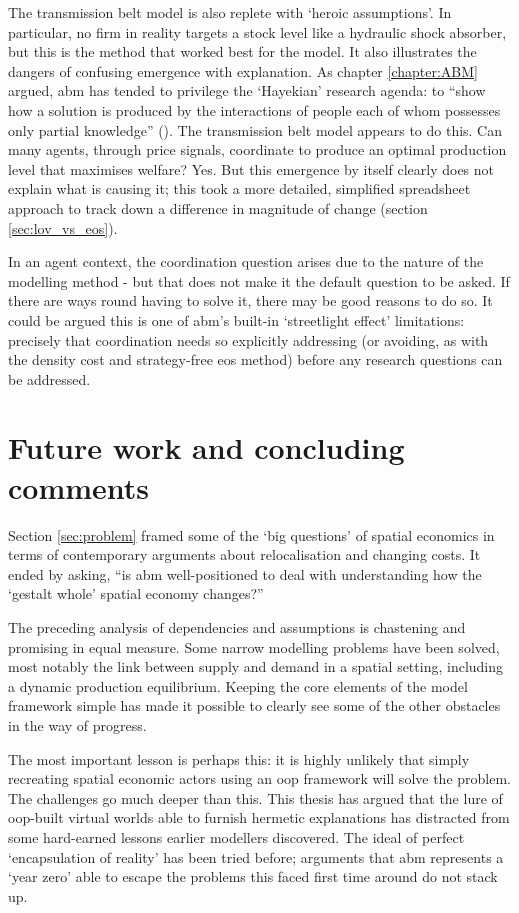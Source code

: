 The transmission belt model is also replete with `heroic assumptions'. In particular, no firm in reality targets a stock level like a hydraulic shock absorber, but this is the method that worked best for the model. It also illustrates the dangers of confusing emergence with explanation. As chapter \ref{chapter:ABM} argued, \gls{abm} has tended to privilege the `Hayekian' research agenda: to ``show how a solution is produced by the interactions of people each of whom possesses only partial knowledge'' (\citealt{hayek_use_1945}). The transmission belt model appears to do this. Can many agents, through price signals, coordinate to produce an optimal production level that maximises welfare? Yes. But this emergence by itself clearly does not explain what is causing it; this took a more detailed, simplified spreadsheet approach to track down a difference in magnitude of change (section \ref{sec:lov_vs_eos}).

In an agent context, the coordination question arises due to the nature of the modelling method - but that does not make it the default question to be asked. If there are ways round having to solve it, there may be good reasons to do so. It could be argued this is one of \gls{abm}'s built-in `streetlight effect' limitations: precisely that coordination needs so explicitly addressing (or avoiding, as with the density cost and strategy-free \gls{eos} method) before any research questions can be addressed. 
 
\section{Future work and concluding comments \label{sec:theend}}

Section \ref{sec:problem} framed some of the `big questions' of spatial economics in terms of contemporary arguments about relocalisation and changing costs. It ended by asking, ``is \gls{abm} well-positioned to deal with understanding how the `gestalt whole' spatial economy changes?''

The preceding analysis of dependencies and assumptions is chastening and promising in equal measure. Some narrow modelling problems have been solved, most notably the link between supply and demand in a spatial setting, including a dynamic production equilibrium. Keeping the core elements of the model framework simple has made it possible to clearly see some of the other obstacles in the way of progress. 

The most important lesson is perhaps this: it is highly unlikely that simply recreating spatial economic actors using an \gls{oop} framework will solve the problem. The challenges go much deeper than this. This thesis has argued that the lure of \gls{oop}-built virtual worlds able to furnish hermetic explanations has distracted from some hard-earned lessons earlier modellers discovered. The ideal of perfect `encapsulation of reality' has been tried before; arguments that \gls{abm} represents a `year zero' able to escape the problems this faced first time around do not stack up. 

